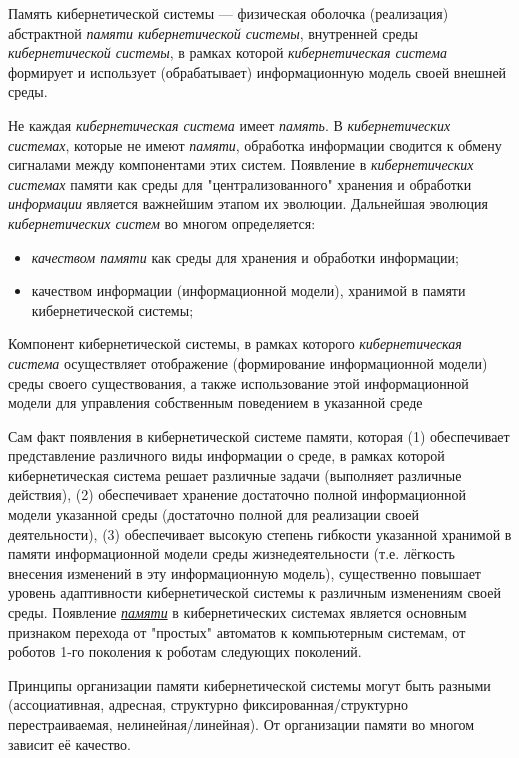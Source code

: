 Память кибернетической системы --- физическая оболочка (реализация) абстрактной \textit{памяти кибернетической системы}, внутренней среды \textit{кибернетической системы}, в рамках которой \textit{кибернетическая система} формирует и использует (обрабатывает) информационную модель своей внешней среды.

Не каждая \textit{кибернетическая система} имеет \textit{память}. 
В \textit{кибернетических системах}, которые не имеют \textit{памяти}, обработка информации сводится к обмену сигналами между компонентами этих систем. Появление в \textit{кибернетических системах} памяти как среды для "централизованного"{} хранения и обработки \textit{информации} является важнейшим этапом их эволюции. Дальнейшая эволюция \textit{кибернетических систем} во многом определяется:
\begin{itemize}
	\item \textit{качеством памяти} как среды для хранения и обработки информации;
	\item качеством информации (информационной модели), хранимой в памяти кибернетической системы;
\end{itemize}

Компонент кибернетической системы, в рамках которого \textit{кибернетическая система} осуществляет отображение (формирование информационной модели) среды своего существования, а также использование этой информационной модели для управления собственным поведением в указанной среде

Сам факт появления в кибернетической системе памяти, которая (1) обеспечивает представление различного виды информации о среде, в рамках которой кибернетическая система решает различные задачи (выполняет различные действия), (2) обеспечивает хранение достаточно полной информационной модели указанной среды (достаточно полной для реализации своей деятельности), (3) обеспечивает высокую степень гибкости указанной хранимой в памяти информационной модели среды жизнедеятельности (т.е. лёгкость внесения изменений в эту информационную модель), существенно повышает уровень адаптивности кибернетической системы к различным изменениям своей среды.
Появление{} \uline{\textit{памяти}} в кибернетических системах является основным признаком перехода от "простых"{} автоматов к компьютерным системам, от роботов 1-го поколения к роботам следующих поколений.

Принципы организации памяти кибернетической системы могут быть разными (ассоциативная, адресная, структурно фиксированная/структурно перестраиваемая, нелинейная/линейная). 
От организации памяти во многом зависит её качество.

